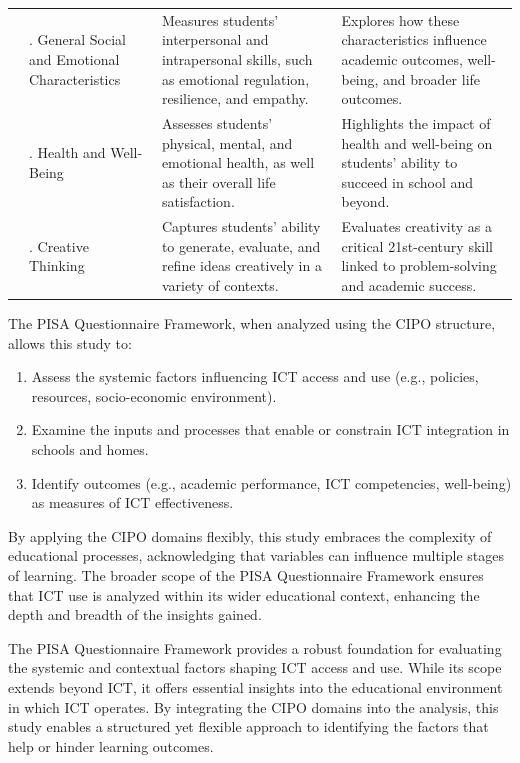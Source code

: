\documentclass[
]{article}
\begin{document}
\begin{longtable}[l]{>{\raggedright\arraybackslash}p{1.5cm}>{\raggedright\arraybackslash}p{3.5cm}>{\raggedright\arraybackslash}p{5cm}>{\raggedright\arraybackslash}p{5cm}}
 & 8. General Social and Emotional Characteristics & Measures students’ interpersonal and intrapersonal skills, such as emotional regulation, resilience, and empathy. & Explores how these characteristics influence academic outcomes, well-being, and broader life outcomes.\\
\addlinespace
 & 9. Health and Well-Being & Assesses students’ physical, mental, and emotional health, as well as their overall life satisfaction. & Highlights the impact of health and well-being on students' ability to succeed in school and beyond.\\
 & 20. Creative Thinking & Captures students’ ability to generate, evaluate, and refine ideas creatively in a variety of contexts. & Evaluates creativity as a critical 21st-century skill linked to problem-solving and academic success.\\
\bottomrule
\end{longtable}

The PISA Questionnaire Framework, when analyzed using the CIPO
structure, allows this study to:

\begin{enumerate}
\def\labelenumi{\arabic{enumi}.}
\item
  Assess the systemic factors influencing ICT access and use (e.g.,
  policies, resources, socio-economic environment).
\item
  Examine the inputs and processes that enable or constrain ICT
  integration in schools and homes.
\item
  Identify outcomes (e.g., academic performance, ICT competencies,
  well-being) as measures of ICT effectiveness.
\end{enumerate}

By applying the CIPO domains flexibly, this study embraces the
complexity of educational processes, acknowledging that variables can
influence multiple stages of learning. The broader scope of the PISA
Questionnaire Framework ensures that ICT use is analyzed within its
wider educational context, enhancing the depth and breadth of the
insights gained.

The PISA Questionnaire Framework provides a robust foundation for
evaluating the systemic and contextual factors shaping ICT access and
use. While its scope extends beyond ICT, it offers essential insights
into the educational environment in which ICT operates. By integrating
the CIPO domains into the analysis, this study enables a structured yet
flexible approach to identifying the factors that help or hinder
learning outcomes.
\end{document}
